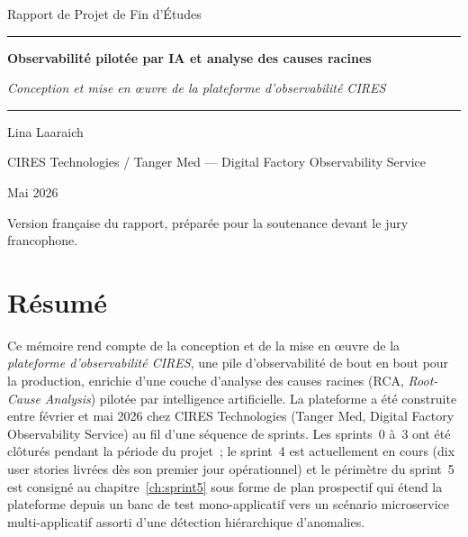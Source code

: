\documentclass[11pt,a4paper,oneside]{report}
\newcommand{\reporttitle}{Observabilité pilotée par IA et analyse des causes racines}
\newcommand{\reportsubtitle}{Conception et mise en \oe{}uvre de la plateforme d'observabilité CIRES}
\newcommand{\reportauthor}{Lina Laaraich}
\newcommand{\reportorg}{CIRES Technologies / Tanger Med --- Digital Factory Observability Service}
\newcommand{\reportdate}{Mai 2026}
\begin{document}
\begin{titlepage}
\centering
\vspace*{2.5cm}
{\fontsize{12}{14}\selectfont Rapport de Projet de Fin d'Études \par}
\vspace{0.6cm}
{\color{accentdark}\rule{0.55\textwidth}{0.6pt}\par}
\vspace{1.0cm}
{\fontsize{24}{30}\selectfont\bfseries \reporttitle \par}
\vspace{0.6cm}
{\fontsize{16}{20}\selectfont\itshape \reportsubtitle \par}
\vspace{0.8cm}
{\color{accentdark}\rule{0.55\textwidth}{0.6pt}\par}
\vspace{2.2cm}
{\large \reportauthor \par}
\vspace{0.4cm}
{\normalsize \reportorg \par}
\vfill
{\large \reportdate \par}
\vspace{0.6cm}
{\small Version française du rapport, préparée pour la soutenance devant le jury francophone.}
\end{titlepage}

\chapter*{Résumé}

Ce mémoire rend compte de la conception et de la mise en \oe{}uvre de
la \emph{plateforme d'observabilité CIRES}, une pile d'observabilité
de bout en bout pour la production, enrichie d'une couche d'analyse
des causes racines (RCA, \emph{Root-Cause Analysis}) pilotée par
intelligence artificielle. La plateforme a été construite entre
février et mai 2026 chez CIRES Technologies (Tanger Med, Digital
Factory Observability Service) au fil d'une séquence de sprints. Les
sprints~0 à~3 ont été clôturés pendant la période du projet~; le
sprint~4 est actuellement en cours (dix user stories livrées dès son
premier jour opérationnel) et le périmètre du sprint~5 est consigné
au chapitre~\ref{ch:sprint5} sous forme de plan prospectif qui étend
la plateforme depuis un banc de test mono-applicatif vers un
scénario microservice multi-applicatif assorti d'une détection
hiérarchique d'anomalies.
\end{document}
